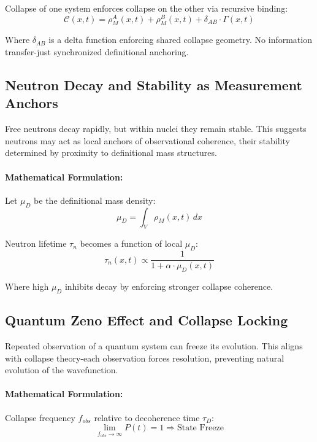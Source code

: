 Collapse of one system enforces collapse on the other via recursive binding:
\begin{equation}
\mathcal{C}(x,t) = \rho_M^A(x,t) + \rho_M^B(x,t) + \delta_{AB} \cdot \Gamma(x,t)
\end{equation}

Where $\delta_{AB}$ is a delta function enforcing shared collapse geometry. No information transfer-just synchronized definitional anchoring.

\subsection{Neutron Decay and Stability as Measurement Anchors}
Free neutrons decay rapidly, but within nuclei they remain stable. This suggests neutrons may act as local anchors of observational coherence, their stability determined by proximity to definitional mass structures.

\paragraph{Mathematical Formulation:}
Let $\mu_D$ be the definitional mass density:
\begin{equation}
\mu_D = \int_V \rho_M(x,t) \, dx
\end{equation}

Neutron lifetime $\tau_n$ becomes a function of local $\mu_D$:
\begin{equation}
\tau_n(x,t) \propto \frac{1}{1 + \alpha \cdot \mu_D(x,t)}
\end{equation}

Where high $\mu_D$ inhibits decay by enforcing stronger collapse coherence.

\subsection{Quantum Zeno Effect and Collapse Locking}
Repeated observation of a quantum system can freeze its evolution. This aligns with collapse theory-each observation forces resolution, preventing natural evolution of the wavefunction.

\paragraph{Mathematical Formulation:}
Collapse frequency $f_{obs}$ relative to decoherence time $\tau_D$:
\begin{equation}
\lim_{f_{obs} \rightarrow \infty} P(t) = 1 \Rightarrow \text{State Freeze}
\end{equation}

